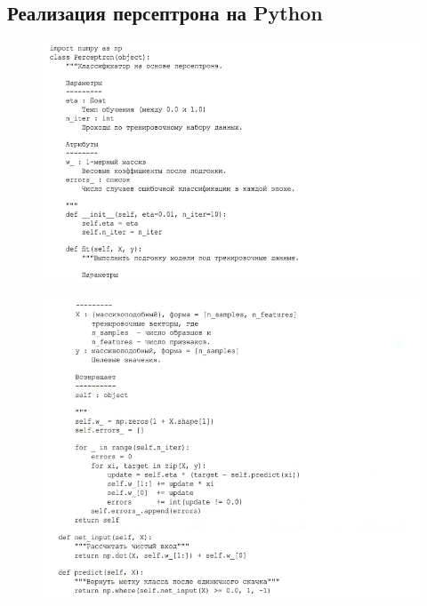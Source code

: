 \documentclass{beamer}
\begin{document}
\subsection{Реализация персептрона на Python}
\begin{frame}[t]
\begin{figure}[h]
\centering
\includegraphics[scale=0.5]{images/lec03-pic10.png}
\end{figure}
\end{frame}

\begin{frame}[t]
\begin{figure}[h]
\centering
\includegraphics[scale=0.5]{images/lec03-pic11.png}
\end{figure}
\end{frame}
\end{document}
